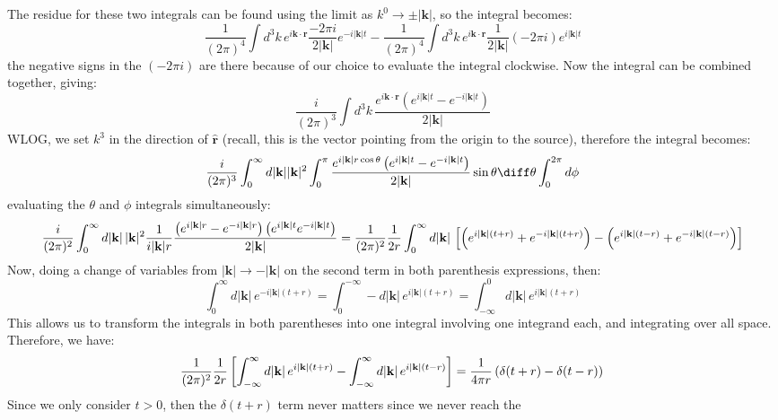 The residue for these two integrals can be found using the limit as \( k^{0} \to \pm |\mathbf{k}| \), so the
integral becomes:
\[
	\frac{1}{(2\pi)^{4}} \int d^3 k\,  e^{i \mathbf{k} \cdot \mathbf{r}} \frac{-2\pi i}{2|\mathbf{k}|} e^{-i
	|\mathbf{k}|t} - \frac{1}{(2\pi)^{4}} \int d^3k\,e^{i \mathbf{k} \cdot \mathbf{r}}
	\frac{1}{2|\mathbf{k}|}(-2\pi i) e^{i|\mathbf{k}|t}
\]
the negative signs in the \( (-2 \pi i) \) are there because of our choice to evaluate the integral
clockwise. Now the integral can be combined together, giving:
\[
	\frac{i}{(2\pi)^3} \int d^3k \, \frac{e^{i \mathbf{k} \cdot \mathbf{r}}\left( e^{i |\mathbf{k}|t} - e^{-i
	|\mathbf{k}|t} \right)}{2|\mathbf{k}|}
\]
WLOG, we set \( k^3 \) in the direction of \( \mathbf{\hat{r}} \) (recall, this is the vector pointing from
the origin to the source), therefore the integral becomes:
\[
	\frac{i}{(2\pi)^3}\int_{0}^{\infty} d |\mathbf{k}| |\mathbf{k}|^2 \int_{0}^{\pi} 
	\frac{e^{i |\mathbf{k}|r \cos \theta}\left( e^{i |\mathbf{k}| t} - e^{-i |\mathbf{k}|t}
	\right)}{2|\mathbf{k}|} \sin \theta \diff \theta \int_{0}^{2\pi} d\phi
\]
evaluating the \( \theta \) and \( \phi \) integrals simultaneously:
\begin{equation*}
	\frac{i}{(2\pi)^2} \int_{0}^{\infty} d |\mathbf{k}|\, |\mathbf{k}|^2 \frac{1}{i|\mathbf{k}|r}\frac{\left(
	e^{i |\mathbf{k}| r} - e^{-i |\mathbf{k}|r}\right) \left( e^{i|\mathbf{k}|t} e^{-i|\mathbf{k}|t}
	\right)}{2|\mathbf{k}|} \\
	= \frac{1}{(2\pi)^2}\frac{1}{2r} \int_{0}^{\infty}d|\mathbf{k}|\, \left[ \left(
	e^{i|\mathbf{k}|(t + r)} + e^{-i |\mathbf{k}|(t + r)}\right) - \left( e^{i|\mathbf{k}|(t - r)} +
	e^{-i|\mathbf{k}|(t - r)} \right) \right]
\end{equation*}
Now, doing a change of variables from \( |\mathbf{k}| \to -|\mathbf{k}| \) on the second term in both parenthesis 
expressions, then:
\[
	\int_{0}^{\infty} d|\mathbf{k}|\, e^{-i |\mathbf{k}|(t + r)} = \int_{0}^{-\infty}-d|\mathbf{k}|\,
	e^{i|\mathbf{k}|(t + r)} = \int_{-\infty}^{0} d|\mathbf{k}|\, e^{i|\mathbf{k}|(t + r)}
\]
This allows us to transform the integrals in both parentheses into one integral involving one integrand each,
and integrating over all space. Therefore, we have:
\[
	\frac{1}{(2\pi)^{2}}\frac{1}{2r}\left[ \int_{-\infty}^{\infty}d|\mathbf{k}|\, e^{i|\mathbf{k}|(t + r)} -
	\int_{-\infty}^{\infty} d|\mathbf{k}|\, e^{i|\mathbf{k}|(t - r)}\right] 
	= \frac{1}{4\pi r}\left( \delta(t + r) - \delta(t - r) \right) \\ 
\]
Since we only consider \( t > 0 \), then the \( \delta(t + r) \) term never matters since we never reach the
